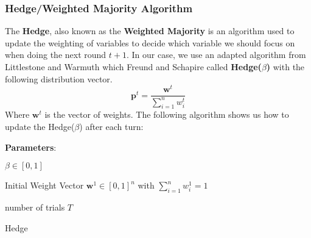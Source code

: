\subsubsection{Hedge/Weighted Majority Algorithm}
The \textbf{Hedge}, also known as the \textbf{Weighted Majority} \cite{wma} is an algorithm used to update the weighting of variables to decide which variable we should focus on when doing the next round $t + 1$. 
In our case, we use an adapted algorithm from Littlestone and Warmuth which Freund and Schapire called \textbf{Hedge($\beta$)} with the following distribution vector.
\begin{equation}
   \textbf{p}^t = \frac{\textbf{w}^t}{\sum_{i=1}^{n} w_i^t } 
\end{equation}
Where $\textbf{w}^t$ is the vector of weights.
The following algorithm shows us how to update the Hedge($\beta$) after each turn:

\begin{algorithm}
\SetAlgoLined
\textbf{Parameters}:
\begin{description}
    \item $\beta \in [0,1]$
    \item Initial Weight Vector $\textbf{w}^1 \in [0,1]^n$ with $\sum_{i=1}^{n} w_i^1 = 1$
    \item number of trials $T$
\end{description}
\caption{Hedge}
\end{algorithm}